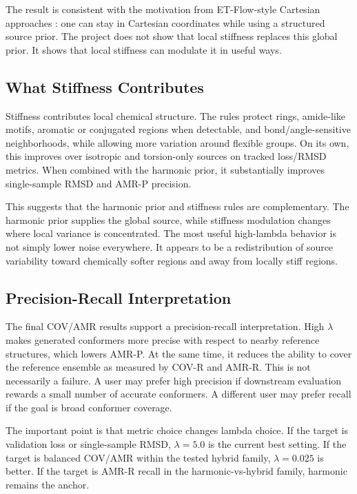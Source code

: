 \documentclass[11pt]{article}
\begin{document}
The result is consistent with the motivation from ET-Flow-style Cartesian approaches \cite{etflow}: one can stay in Cartesian coordinates while using a structured source prior. The project does not show that local stiffness replaces this global prior. It shows that local stiffness can modulate it in useful ways.

\subsection{What Stiffness Contributes}

Stiffness contributes local chemical structure. The rules protect rings, amide-like motifs, aromatic or conjugated regions when detectable, and bond/angle-sensitive neighborhoods, while allowing more variation around flexible groups. On its own, this improves over isotropic and torsion-only sources on tracked loss/RMSD metrics. When combined with the harmonic prior, it substantially improves single-sample RMSD and AMR-P precision.

This suggests that the harmonic prior and stiffness rules are complementary. The harmonic prior supplies the global source, while stiffness modulation changes where local variance is concentrated. The most useful high-lambda behavior is not simply lower noise everywhere. It appears to be a redistribution of source variability toward chemically softer regions and away from locally stiff regions.

\subsection{Precision-Recall Interpretation}

The final COV/AMR results support a precision-recall interpretation. High $\lambda$ makes generated conformers more precise with respect to nearby reference structures, which lowers AMR-P. At the same time, it reduces the ability to cover the reference ensemble as measured by COV-R and AMR-R. This is not necessarily a failure. A user may prefer high precision if downstream evaluation rewards a small number of accurate conformers. A different user may prefer recall if the goal is broad conformer coverage.

The important point is that metric choice changes lambda choice. If the target is validation loss or single-sample RMSD, $\lambda=5.0$ is the current best setting. If the target is balanced COV/AMR within the tested hybrid family, $\lambda=0.025$ is better. If the target is AMR-R recall in the harmonic-vs-hybrid family, harmonic remains the anchor.
\end{document}
